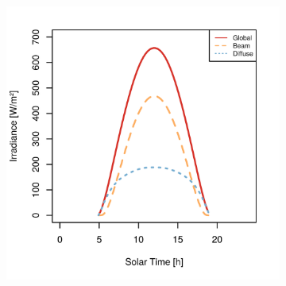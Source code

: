 \vspace{0.5cm}

\begin{figure}[h]
\captionsetup[subfigure]{justification=centering}
\centering
    \setlength{\subfigureWidth}{0.50\textwidth}
    \setlength{\graphicsHeight}{80mm}
    \hypersetup{hidelinks=true}%
    \begin{subfigure}[t]{\subfigureWidth}
        \centering
            \includegraphics[height=\graphicsHeight]{sections/mars-solar-energy/solar-radiation/plots/gh-gbh-gdh-variation-1-for-ls-248-phi-34-tau-04-and-albedo-027.png}
            \label{fig:plot:sub:irradiance-phi-m34}
    \end{subfigure}\hfill
    \begin{subfigure}[t]{\subfigureWidth}
        \centering

\end{subfigure}
\end{figure}
